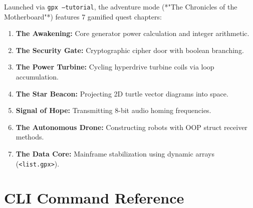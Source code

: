 \documentclass[11pt,a4paper]{report}
\begin{document}
Launched via \texttt{gpx --tutorial}, the adventure mode (*"The Chronicles of the Motherboard"*) features 7 gamified quest chapters:
\begin{enumerate}
    \item \textbf{The Awakening:} Core generator power calculation and integer arithmetic.
    \item \textbf{The Security Gate:} Cryptographic cipher door with boolean branching.
    \item \textbf{The Power Turbine:} Cycling hyperdrive turbine coils via loop accumulation.
    \item \textbf{The Star Beacon:} Projecting 2D turtle vector diagrams into space.
    \item \textbf{Signal of Hope:} Transmitting 8-bit audio homing frequencies.
    \item \textbf{The Autonomous Drone:} Constructing robots with OOP struct receiver methods.
    \item \textbf{The Data Core:} Mainframe stabilization using dynamic arrays (\texttt{<list.gpx>}).
\end{enumerate}

\chapter{CLI Command Reference}
\end{document}
